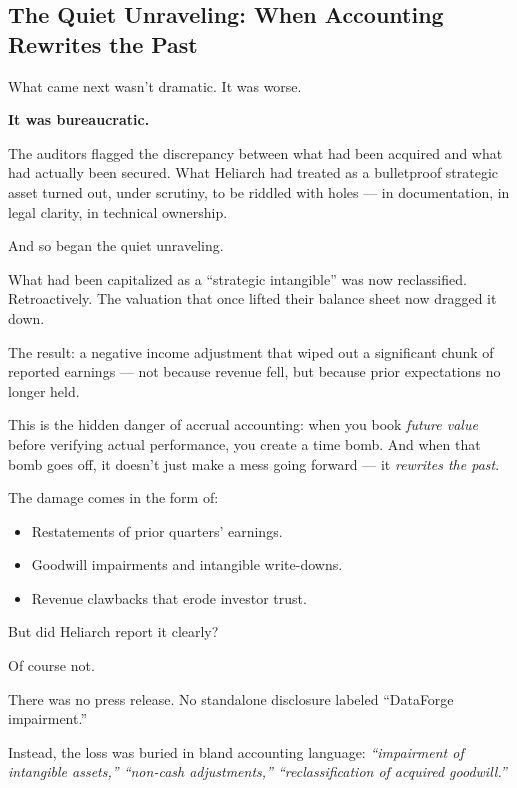 \medskip    

\subsection{The Quiet Unraveling: When Accounting Rewrites the Past}

What came next wasn’t dramatic. It was worse.

\textbf{It was bureaucratic.}

The auditors flagged the discrepancy between what had been acquired and what had actually been secured. What Heliarch had treated as a bulletproof strategic asset turned out, under scrutiny, to be riddled with holes — in documentation, in legal clarity, in technical ownership.

And so began the quiet unraveling.

What had been capitalized as a “strategic intangible” was now reclassified. Retroactively. The valuation that once lifted their balance sheet now dragged it down.

The result: a negative income adjustment that wiped out a significant chunk of reported earnings — not because revenue fell, but because prior expectations no longer held.

This is the hidden danger of accrual accounting:
when you book \textit{future value} before verifying actual performance, you create a time bomb.
And when that bomb goes off, it doesn’t just make a mess going forward — it \textit{rewrites the past}.

The damage comes in the form of:

\begin{itemize}
\item Restatements of prior quarters’ earnings.
\item Goodwill impairments and intangible write-downs.
\item Revenue clawbacks that erode investor trust.
\end{itemize}

But did Heliarch report it clearly?

Of course not.

There was no press release. No standalone disclosure labeled “DataForge impairment.”

Instead, the loss was buried in bland accounting language:
\textit{“impairment of intangible assets,” “non-cash adjustments,” “reclassification of acquired goodwill.”}

\medskip 

